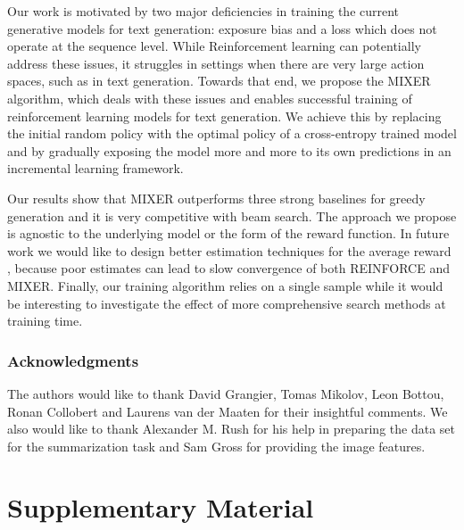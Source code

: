 \documentclass{article} \usepackage{iclr2016_conference,times}
\begin{document}
Our work is motivated by two major deficiencies in training the current generative models for text generation: exposure bias and a loss which does not operate at the sequence level.
While Reinforcement learning can potentially address these issues, it struggles in settings when 
there are very large action spaces, such as in text generation. Towards that end, 
we propose the MIXER algorithm, which deals with these issues and enables successful training of reinforcement learning models for text generation. 
We achieve this by replacing the initial random policy with the optimal policy of a cross-entropy trained model and by gradually exposing the model more and more to its own predictions in an incremental learning framework.








Our results show that MIXER outperforms three strong baselines for greedy generation and it is very competitive with beam search. 
The approach we propose is agnostic to the underlying model or the form of the reward function. 
In future work we would like to design better estimation techniques for the average reward , because poor estimates can lead to slow convergence of both REINFORCE and MIXER. 
Finally, our training algorithm relies on a single sample while it would be interesting to investigate the effect of more comprehensive search methods at training time.


















 
\subsubsection*{Acknowledgments}
The authors would like to thank David Grangier, Tomas Mikolov, Leon Bottou, Ronan Collobert and Laurens van der Maaten for their insightful comments. 
We also would like to thank Alexander M. Rush for his help in preparing the data set for the summarization task and Sam Gross for providing the image features. 



\newpage
\section{Supplementary Material}
\end{document}
